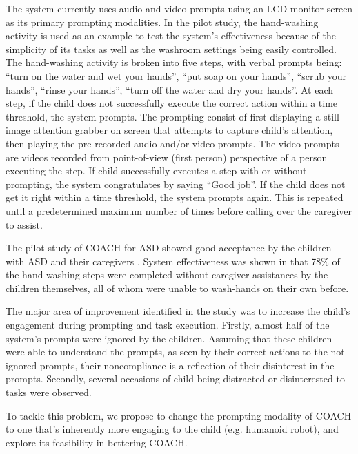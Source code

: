 The system currently uses audio and video prompts using an LCD monitor screen as its primary prompting modalities.  In the pilot study, the hand-washing activity is used as an example to test the system's effectiveness because of the simplicity of its tasks as well as the washroom settings being easily controlled.  The hand-washing activity is broken into five steps, with verbal prompts being: ``turn on the water and wet your hands'', ``put soap on your hands'', ``scrub your hands'', ``rinse your hands'', ``turn off the water and dry your hands''.  At each step, if the child does not successfully execute the correct action within a time threshold, the system prompts.  The prompting consist of first displaying a still image attention grabber on screen that attempts to capture child's attention, then playing the pre-recorded audio and/or video prompts.  The video prompts are videos recorded from point-of-view (first person) perspective of a person executing the step.  If child successfully executes a step with or without prompting, the system congratulates by saying ``Good job''.  If the child does not get it right within a time threshold, the system prompts again.  This is repeated until a predetermined maximum number of times before calling over the caregiver to assist.  


The pilot study of COACH for ASD showed good acceptance by the children with ASD and their caregivers \cite{bimbrahw2012investigating}.  System effectiveness was shown in that 78\% of the hand-washing steps were completed without caregiver assistances by the children themselves, all of whom were unable to wash-hands on their own before.


The major area of improvement identified in the study was to increase the child's engagement during prompting and task execution.  Firstly, almost half of the system's prompts were ignored by the children.  Assuming that these children were able to understand the prompts, as seen by their correct actions to the not ignored prompts, their noncompliance is a reflection of their disinterest in the prompts.  Secondly, several occasions of child being distracted or disinterested to tasks were observed.


To tackle this problem, we propose to change the prompting modality of COACH to one that's inherently more engaging to the child (e.g. humanoid robot), and explore its feasibility in bettering COACH.
